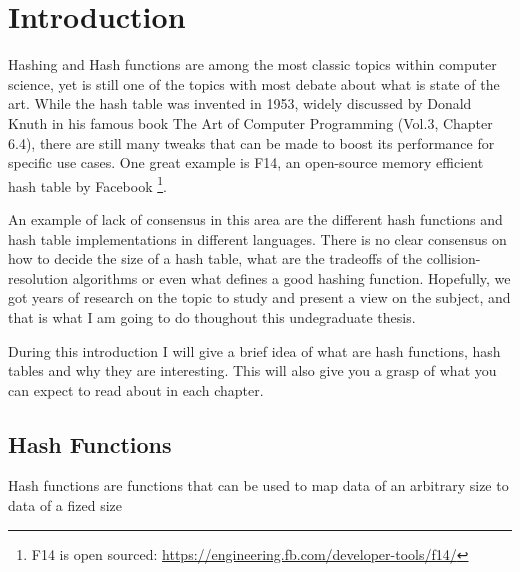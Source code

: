 \chapter{Introduction}
\label{cap:Introduction}

Hashing and Hash functions are among the most classic topics within computer science, yet is still one of the topics with most debate about what is state of the art. While the hash table was invented in 1953, widely discussed by Donald Knuth in his famous book The Art of Computer Programming (Vol.3, Chapter 6.4), there are still many tweaks that can be made to boost its performance for specific use cases. One great example is F14, an open-source memory efficient hash table by Facebook \footnote{F14 is open sourced: \url{https://engineering.fb.com/developer-tools/f14/}}.

An example of lack of consensus in this area are the different hash functions and hash table implementations in different languages. There is no clear consensus on how to decide the size of a hash table, what are the tradeoffs of the collision-resolution algorithms or even what defines a good hashing function. Hopefully, we got years of research on the topic to study and present a view on the subject, and that is what I am going to do thoughout this undegraduate thesis.

During this introduction I will give a brief idea of what are hash functions, hash tables and why they are interesting. This will also give you a grasp of what you can expect to read about in each chapter.

\section{Hash Functions}

Hash functions are functions that can be used to map data of an arbitrary size to data of a fized size \cite{HashFuncWiki}